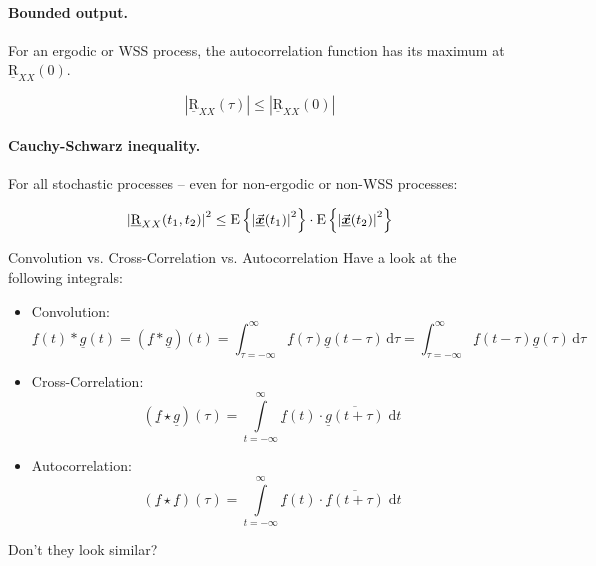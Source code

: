 \begin{refsection}
\paragraph{Bounded output.}

For an ergodic or \ac{WSS} process, the autocorrelation function has its maximum at $\underline{\mathrm{R}}_{XX}(0)$.

\begin{equation}
	\left|\underline{\mathrm{R}}_{XX}(\tau)\right| \leq \left|\underline{\mathrm{R}}_{XX}(0)\right|
\end{equation}

\paragraph{Cauchy-Schwarz inequality.}

For all stochastic processes -- even for non-ergodic or non-\acs{WSS} processes:

\begin{equation}
	\left|\underline{\mathrm{R}}_{XX}(t_1, t_2)\right|^2 \leq \mathrm{E}\left\{ \left|\vec{\bm{\underline{x}}}(t_1)\right|^2 \right\} \cdot \mathrm{E}\left\{ \left|\vec{\bm{\underline{x}}}(t_2)\right|^2 \right\}
\end{equation}

\begin{excursus}{Convolution vs. Cross-Correlation vs. Autocorrelation}
	Have a look at the following integrals:
	\begin{itemize}
		\item Convolution:
		\begin{equation*}
			\underline{f}(t) * \underline{g}(t) = \left(\underline{f} * \underline{g}\right) (t) = \int_{\tau = -\infty}^{\infty} \underline{f}(\tau) \underline{g}(t - \tau) \, \mathrm{d} \tau  = \int_{\tau = -\infty}^{\infty} \underline{f}(t - \tau) \underline{g}(\tau) \, \mathrm{d} \tau
		\end{equation*}
		\item Cross-Correlation:
		\begin{equation*}
			\left(\underline{f} \star \underline{g}\right)(\tau) = \int\limits_{t = -\infty}^{\infty} \underline{f}(t) \cdot \overline{\underline{g}(t+\tau)} \; \mathrm{d} t
		\end{equation*}
		\item Autocorrelation:
		\begin{equation*}
			\left(\underline{f} \star \underline{f}\right)(\tau) = \int\limits_{t = -\infty}^{\infty} \underline{f}(t) \cdot \overline{\underline{f}(t+\tau)} \; \mathrm{d} t
		\end{equation*}
	\end{itemize}
	Don't they look similar?
	

\end{excursus}
\end{refsection}
